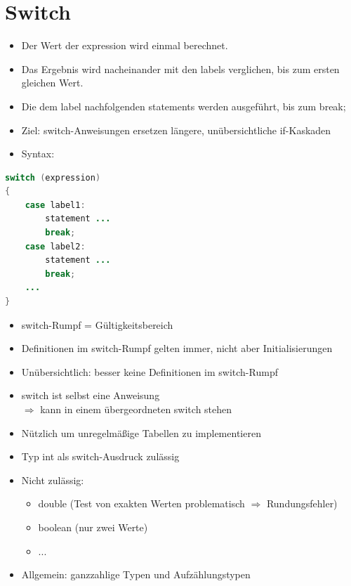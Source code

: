  \section{Switch}
 \begin{itemize}
 \item Der Wert der expression wird einmal berechnet.
\item Das Ergebnis wird nacheinander mit den labels verglichen, bis zum ersten gleichen Wert.
\item  Die dem label nachfolgenden statements werden ausgeführt, bis zum break;
\item Ziel: switch-Anweisungen ersetzen längere, unübersichtliche if-Kaskaden
\item  Syntax:
\end{itemize}
 \begin{lstlisting}[language=JAVA]
switch (expression)
{
	case label1:
		statement ...
		break;
	case label2:
		statement ...
		break;
	...
}
 \end{lstlisting}
\begin{itemize}
\item switch-Rumpf = Gültigkeitsbereich
\item Definitionen im switch-Rumpf gelten immer, nicht aber Initialisierungen
\item Unübersichtlich: besser keine Definitionen im switch-Rumpf
\item switch ist selbst eine Anweisung\\
$\Rightarrow$ kann in einem übergeordneten switch stehen
\item Nützlich um unregelmäßige Tabellen zu implementieren
\item Typ int als switch-Ausdruck zulässig
\item Nicht zulässig:
\begin{itemize}
	\item double (Test von exakten Werten problematisch $\Rightarrow$ Rundungsfehler)
	\item boolean (nur zwei Werte)
	\item ...
\end{itemize}
\item Allgemein: ganzzahlige Typen und Aufzählungstypen
\end{itemize}

